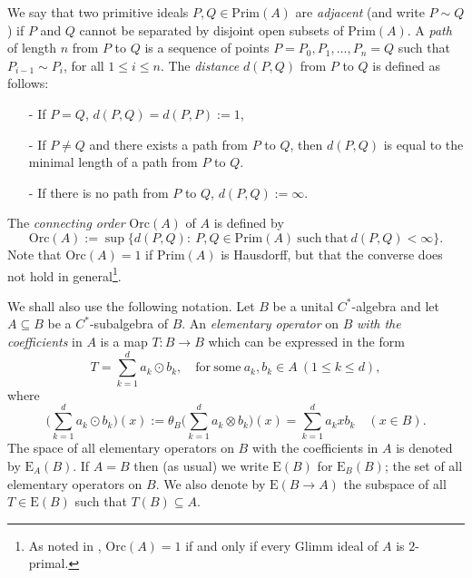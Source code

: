 \documentclass[]{amsart}
\theoremstyle{remark}
\theoremstyle{definition}
\theoremstyle{question}
\numberwithin{equation}{section}
\begin{document}
We say that two primitive ideals $P ,Q \in \mathrm{Prim}(A)$ are
\textit{adjacent} (and write $P\sim Q$) if $P$ and $Q$ cannot be separated by
disjoint open
subsets of $\mathrm{Prim}(A)$. A \textit{path} of length $n$ from $P$ to $Q$ is
a sequence of points $P=P_0,P_1, \ldots, P_n=Q$ such that $P_{i-1} \sim P_i$,
for all $1\leq i \leq n$. The \textit{distance} $d(P,Q)$ from $P$ to $Q$ is defined as follows:
\begin{itemize}
\item[-] If $P=Q$, $d(P,Q)=d(P,P):=1$,
\item[-] If $P\neq Q$ and there exists a path from $P$ to $Q$, then $d(P,Q)$ is equal to the minimal length of a path from
$P$ to $Q$.
\item[-] If there is no path from $P$ to $Q$, $d(P,Q):=\infty$.
\end{itemize}
The \textit{connecting
order} $\mathrm{Orc}(A)$ of $A$ is defined by
$$\mathrm{Orc}(A):= \sup\{d(P,Q) : \ P,Q \in \mathrm{Prim}(A) \ \mathrm{such} \
\mathrm{that} \ d(P,Q) < \infty \}.$$
Note that $\mathrm{Orc}(A)=1$ if $\mathrm{Prim}(A)$ is Hausdorff, but that the converse does not hold in general\footnote{As noted in \cite{Som2}, $\mathrm{Orc}(A)=1$ if and only if every Glimm ideal of $A$ is $2$-primal.}.

\medskip
We shall also use the following notation. Let $B$ be a unital $C^*$-algebra and
let $A \subseteq B$ be a $C^*$-subalgebra of $B$. An \textit{elementary operator} on $B$
\textit{with the coefficients} in $A$ is a map $T: B \to B$ which can be expressed in the
form
$$
T=\sum_{k=1}^d a_k \odot b_k, \quad  \mathrm{for} \ \mathrm{some } \ a_k,b_k \in
A \ (1\leq k \leq d),
$$
where
$$\Big(\sum_{k=1}^d a_k \odot b_k\Big)(x):=\theta_B\Big( \sum_{k=1}^d a_k \otimes b_k\Big)(x)=\sum_{k=1}^d a_k x b_k \quad (x \in
B).
$$
The space of all elementary operators on $B$ with the coefficients in $A$ is
denoted by ${\mathrm{E}}_A(B)$. If $A=B$ then (as usual) we write ${\mathrm{E}}(B)$ for ${\mathrm{E}}_B(B)$;
the set of all elementary operators on $B$. We also denote by ${\mathrm{E}}(B\rightarrow A)$ the
subspace of all $T \in {\mathrm{E}}(B)$ such that $T(B) \subseteq A$.
\end{document}
